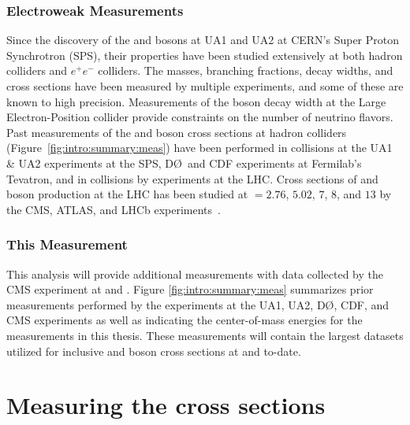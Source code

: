 \subsubsection{Electroweak Measurements}
Since the discovery of the \W and \Z bosons at UA1 and UA2 at CERN's Super Proton Synchrotron (SPS)\cite{UA1_Z,UA2_Z,BANNER1983476,ARNISON1983103}, their properties have been studied extensively at both hadron colliders and $e^+e^-$ colliders. The masses, branching fractions,  decay widths, and cross sections have been measured by multiple experiments, and some of these are known to high precision\cite{PhysRevD.98.030001}. Measurements of the \Z boson decay width at the Large Electron-Position collider provide constraints on the number of neutrino flavors\cite{ALEPH:2005ab}. 
Past measurements of the \W and \Z boson cross sections at hadron colliders (Figure~\ref{fig:intro:summary:meas}) have been performed in \ppbar collisions at the UA1 \& UA2 experiments at the SPS, D\O ~and CDF experiments at Fermilab's Tevatron, and in \pp collisions by experiments at the LHC. 
Cross sections of \Wpm and \Z boson production at the LHC has been studied at \s $= 2.76$, $5.02$, $7$, $8$, and $13$ \TeV by the CMS, ATLAS, and LHCb experiments~\cite{Aad:2019bdc,Aaboud:2018nic,Aaboud:2016btc,CMS:2011aa,Aaij:2014wba,Aaij:2012mda,Aaij:2015gna,Aaij:2016qqz,Aaij:2016mgv,Aaij:2015zlq,Chatrchyan:2014mua,Aad:2016naf}. 
\subsubsection{This Measurement}
This analysis will provide additional measurements with data collected by the CMS experiment at \sg and \sh. Figure \ref{fig:intro:summary:meas} summarizes prior measurements performed by the experiments at the UA1, UA2, D\O, CDF, and CMS experiments as well as indicating the center-of-mass energies for the measurements in this thesis. These measurements will contain the largest datasets utilized for inclusive \W and \Z boson cross sections at \sg and  \sh to-date\cite{Aad:2019bdc,Aaboud:2018nic,Aaboud:2016btc,Aad:2016naf}. 



\section{Measuring the cross sections}
